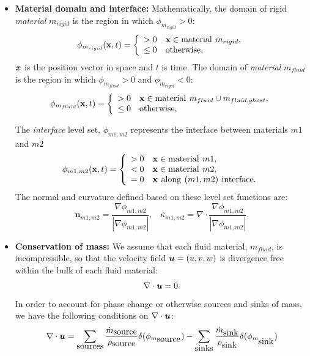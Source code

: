 \documentclass[]{article}
\newcommand{\mb}{\mathbf}
\newcommand{\tn}{\textnormal}
\newcommand{\bmu}{\mbox{\boldmath $u$\unboldmath}}
\newcommand{\bmx}{\mbox{\boldmath $x$\unboldmath}}
\begin{document}
\begin{itemize}
\item \textbf{Material domain and interface:}
Mathematically, the domain of rigid \emph{material} $m_{rigid}$ is the 
region in which $\phi_{m_{rigid}}>0$:
\begin{equation}
  \phi_{m_{rigid}}(\mb{x},t) = \left\{
    \begin{array}{ll}
      > 0 & \mb{x} \in \tn{material}\,\: m_{rigid}, \\ 
      \leq 0 & \tn{otherwise},
  \end{array}
\right.
\end{equation}
$\bmx$ is the position vector in space and $t$ is time. 
The domain of \emph{material} $m_{fluid}$ is the 
region in which $\phi_{m_{fluid}}>0$ and 
$\phi_{m_{rigid}}<0$:
\begin{equation}
  \phi_{m_{fluid}}(\mb{x},t) = \left\{
    \begin{array}{ll}
      > 0 & \mb{x} \in \tn{material}\,\: m_{fluid}\cup m_{fluid,ghost}, \\ 
      \leq 0 & \tn{otherwise},
  \end{array}
\right.
\end{equation}

The \emph{interface} level set,
$\phi_{m1,m2}$
represents the interface between materials
$m1$ and $m2$
\begin{equation}
  \phi_{m1,m2}(\mb{x},t) = \left\{
    \begin{array}{ll}
      > 0 & \mb{x} \in \tn{material}\,\: m1, \\ 
      < 0 & \mb{x} \in \tn{material}\,\: m2, \\ 
      = 0 & \mb{x}\,\: \tn{along}\,\:(m1,m2)\,\:\tn{interface}. \\ 
    \end{array}
\right.
\end{equation}
The normal and curvature defined based on these level set functions are:
\begin{equation}
  \mb{n}_{m1,m2} = 
   \frac{\nabla \phi_{m1,m2}}{|\nabla \phi_{m1,m2}|}, \hspace{10pt}   
   \kappa_{m1,m2} = 
   \nabla \cdot \frac{\nabla \phi_{m1,m2}}{|\nabla \phi_{m1,m2}|}.
\end{equation}
\item \textbf{Conservation of mass:}
We assume that each fluid material, $m_{fluid}$, is incompressible, 
so that the velocity 
field $\bmu = (u, v, w)$ is divergence free within the bulk of each
fluid material:
\begin{equation}
  \label{eq:cnt}
  \nabla \cdot \bmu = 0.
\end{equation}
In order to account for phase change or otherwise sources and sinks of mass,
we have the following conditions on $\nabla \cdot \bmu$:
\begin{eqnarray*}
\nabla \cdot \bmu = 
  \sum_{\mbox{sources}} 
  \frac{\dot{m}_{\mbox{source}}}
       {\rho_{\mbox{source}}}\delta(\phi_{m_{\mbox{source}}}) -
  \sum_{\mbox{sinks}} 
  \frac{\dot{m}_{\mbox{sink}}}
       {\rho_{\mbox{sink}}}\delta(\phi_{m_{\mbox{sink}}}) 
\end{eqnarray*}


\end{itemize}
\end{document}
